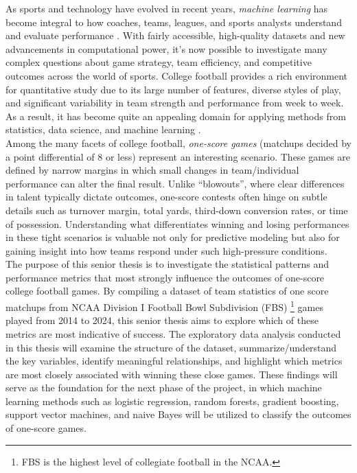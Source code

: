 \documentclass[11pt]{amsart}
\theoremstyle{definition}                  %
\theoremstyle{remark}                       %
\numberwithin{equation}{section}
\begin{document}
As sports and technology have evolved in recent years, \textit{machine learning} has become integral to how coaches, teams, leagues, and sports analysts understand and evaluate performance \cite{rein2016bigdata, lewis2003moneyball}. With fairly accessible, high-quality datasets and new advancements in computational power, it’s now possible to investigate many complex questions about game strategy, team efficiency, and competitive outcomes across the world of sports. College football provides a rich environment for quantitative study due to its large number of features, diverse styles of play, and significant variability in team strength and performance from week to week. As a result, it has become quite an appealing domain for applying methods from statistics, data science, and machine learning \cite{hastie2009elements, james2021introduction}.\\

Among the many facets of college football, \textit{one-score games} (matchups decided by a point differential of 8 or less) represent an interesting scenario. These games are defined by narrow margins in which small changes in team/individual performance can alter the final result. Unlike “blowouts”, where clear differences in talent typically dictate outcomes, one-score contests often hinge on subtle details such as turnover margin, total yards, third-down conversion rates, or time of possession. Understanding what differentiates winning and losing performances in these tight scenarios is valuable not only for predictive modeling but also for gaining insight into how teams respond under such high-pressure conditions.\\

The purpose of this senior thesis is to investigate the statistical patterns and performance metrics that most strongly influence the outcomes of one-score college football games. By compiling a dataset of team statistics of one score matchups from NCAA Division I Football Bowl Subdivision (FBS) \footnote{FBS is the highest level of collegiate football in the NCAA.} games played from 2014 to 2024, this senior thesis aims to explore which of these metrics are most indicative of success. The exploratory data analysis conducted in this thesis will examine the structure of the dataset, summarize/understand the key variables, identify meaningful relationships, and highlight which metrics are most closely associated with winning these close games. These findings will serve as the foundation for the next phase of the project, in which machine learning methods such as logistic regression, random forests, gradient boosting, support vector machines, and naive Bayes will be utilized to classify the outcomes of one-score games.\\
\end{document}
